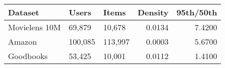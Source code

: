 \begin{tabularx}{\columnwidth}{lllrr}
\toprule
 Dataset       & Users   & Items   &   Density &   95th/50th \\
\midrule
 Movielens 10M & 69,879  & 10,678  &    0.0134 &      7.4200 \\
 Amazon        & 100,085 & 113,997 &    0.0003 &      5.6700 \\
 Goodbooks     & 53,425  & 10,001  &    0.0112 &      1.4100 \\
\bottomrule
\end{tabularx}